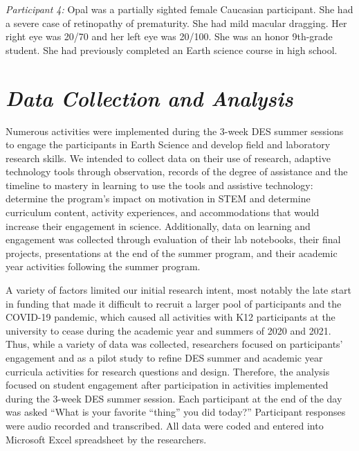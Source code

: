 \documentclass[11.5pt]{sig-alternate}
\begin{document}
\begin{large}
\textit{Participant 4:} Opal was a partially sighted female Caucasian participant. She had a severe case of retinopathy of prematurity.  She had mild macular dragging. Her right eye was 20/70 and her left eye was 20/100. She was an honor 9th-grade student.  She had previously completed an Earth science course in high school. 

\section*{\textit{Data Collection and Analysis}}

Numerous activities were implemented during the 3-week DES summer sessions to engage the participants in Earth Science and develop field and laboratory research skills. We intended to collect data on their use of research, adaptive technology tools through observation, records of the degree of assistance and the timeline to mastery in learning to use the tools and assistive technology: determine the program’s impact on motivation in STEM and determine curriculum content, activity experiences, and accommodations that would increase their engagement in science. Additionally, data on learning and engagement was collected through evaluation of their lab notebooks, their final projects, presentations at the end of the summer program, and their academic year activities following the summer program. 

A variety of factors limited our initial research intent, most notably the late start in funding that made it difficult to recruit a larger pool of participants and the COVID-19 pandemic, which caused all activities with K12 participants at the university to cease during the academic year and summers of 2020 and 2021.  Thus, while a variety of data was collected, researchers focused on participants’ engagement and as a pilot study to refine DES summer and academic year curricula activities for research questions and design.  Therefore, the analysis focused on student engagement after participation in activities implemented during the 3-week DES summer session.  Each participant at the end of the day was asked “What is your favorite “thing” you did today?” Participant responses were audio recorded and transcribed.  All data were coded and entered into Microsoft Excel spreadsheet by the researchers. 


\end{large}
\end{document}
